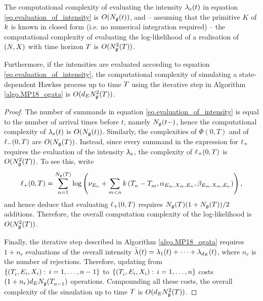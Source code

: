 \documentclass[10pt, article,table]{article}
\begin{document}
\begin{corol}
\label{corol.complexities}
The computational complexity of evaluating the intensity $\intensity(t)$ in equation \eqref{eq.evaluation_of_intensity} is $O(\groundProc(t))$, and -- assuming that the primitive $K$ of $\parametricHawkesKernel$ is known in closed form (i.e. no numerical integration required) -- the computational complexity of evaluating the log-likelihood of a realisation of $(\multiCountingProc, \stateVariable)$ with time horizon $\timeHorizon$ is $O(\groundProc\squared(\timeHorizon))$. 

Furthermore, if the intensities are evaluated according to equation \eqref{eq.evaluation_of_intensity}, the computational complexity of simulating a state-dependent Hawkes process up to time $\timeHorizon$ using the iterative step in Algorithm \ref{algo.MP18_ogata} is $O(\numEventTypes\groundProc\squared(\timeHorizon))$.
\end{corol}
\begin{proof}
The number of summands in equation \eqref{eq.evaluation_of_intensity} is equal to the number of arrival times before $t$, namely $\groundProc(t-)$, hence the computational complexity of $\intensity(t)$ is $O(\groundProc(t))$. Similarly, the complexities of $\Phi(0,T)$ and of $\lminus(0,T)$ are $O(\groundProc(T))$. Instead, since every summand in the expression for $\lplus$ requires the evaluation of the intensity $\intensity$, the complexity of $\lplus(0,T)$ is $O(\groundProc\squared(T))$. To see this, write 
\begin{equation*}
 \lplus(0,T) = \sum_{n=1}^{\groundProc(T)}
 \log \left(
 \baseRate_{\event} + \sum_{m < n}\parametricHawkesKernel\left(\arrivalTimes[]_n - \arrivalTimes[]_m, \impCoef_{\event[m],\stateVariable_m,\event[n]}, \decCoef_{\event[m],\stateVariable_m,\event[n]}\right)
 \right),
\end{equation*}
and hence deduce that evaluating $\lplus(0,T)$ requires $\groundProc(T)(1+\groundProc(T))/2$ additions. 
Therefore, the overall computation complexity of the log-likelihood is $O(\groundProc\squared(T))$.

Finally, the iterative step described in Algorithm \ref{algo.MP18_ogata} requires $1+n_r$ evaluations of the overall intensity $\bar{\intensity[]}(t) = \intensity[1](t)+\dots+\intensity[\numEventTypes](t)$, where $n_r$ is the number of rejections. Therefore, updating from $\lbrace(\arrivalTimes[]_i,\event[i],\stateVariable_i): \, i=1,\dots,n-1\rbrace$ to $\lbrace(\arrivalTimes[]_i,\event[i],\stateVariable_i): \, i=1,\dots,n\rbrace$ costs $(1+n_r)\numEventTypes\groundProc(\arrivalTimes[]_{n-1})$ operations. Compounding all these costs, the overall complexity of the simulation up to time $\timeHorizon$ is $O(\numEventTypes\groundProc\squared(\timeHorizon))$. 
\end{proof}
\end{document}
